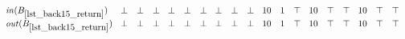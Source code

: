 \begin{minipage}{5in}
\begin{math}
\begin{array}{l@{\phantom{X}}ccc@{\phantom{X}}ccc@{\phantom{X}}ccc@{\phantom{X}}ccc@{\phantom{X}}ccc@{\phantom{X}}ccc}
    \inB{lst_back15_return} & %
    \bot & \bot & \bot & %
    \bot & \bot & \bot & %
    \bot & \bot & \bot & %
    10 & 1 & \top & %
    10 & \top & \top & %
    10 & \top & \top \\ %
    \outB{lst_back15_return} & %
    \bot & \bot & \bot & %
    \bot & \bot & \bot & %
    \bot & \bot & \bot & %
    10 & 1 & \top & %
    10 & \top & \top & %
    10 & \top & \top \\\\ %

  \end{array}
\end{math}
\end{minipage}
